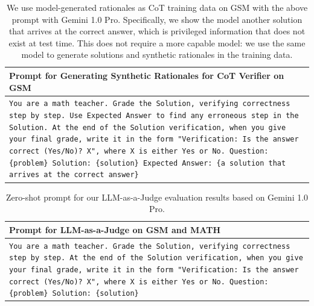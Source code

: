 \begin{table}[ht]
\footnotesize
    \centering
\caption{We use model-generated rationales as CoT training data on GSM with the above prompt with Gemini 1.0 Pro. Specifically, we show the model another solution that arrives at the correct answer, which is privileged information that does not exist at test time. This does not require a more capable model: we use the same model to generate solutions and synthetic rationales in the training data.}
\label{prompt-cot-rationale-generation}
    \begin{tabular}{ |p{15.5cm}| }
    \toprule

\textbf{Prompt for Generating Synthetic Rationales for CoT Verifier on GSM} \\ \midrule
\multicolumn{1}{|p{15.5cm}|}{
\texttt{You are a math teacher. Grade the Solution, verifying correctness step by step. Use Expected Answer to find any erroneous step in the Solution.
\newline
At the end of the Solution verification, when you give your final grade, write it in the form "Verification: Is the answer correct (Yes/No)? X", where X is either Yes or No.
\newline
Question: \{problem\}\newline
Solution: \{solution\}\newline
Expected Answer: \{a solution that arrives at the correct answer\}
}} \\ \midrule
\end{tabular}

\end{table}

\begin{table}[ht]
\footnotesize
    \centering
    \caption{Zero-shot prompt for our LLM-as-a-Judge evaluation results based on Gemini 1.0 Pro.}\label{llm-as-a-judge}
    \begin{tabular}{ |p{15.5cm}| }
    \toprule

\textbf{Prompt for LLM-as-a-Judge on GSM and MATH} \\ \midrule
\multicolumn{1}{|p{15.5cm}|}{
\texttt{You are a math teacher. Grade the Solution, verifying correctness step by step. 
\newline
At the end of the Solution verification, when you give your final grade, write it in the form "Verification: Is the answer correct (Yes/No)? X", where X is either Yes or No.
\newline
Question: \{problem\}\newline
Solution: \{solution\}
}} \\ \midrule
\end{tabular}
\end{table}

